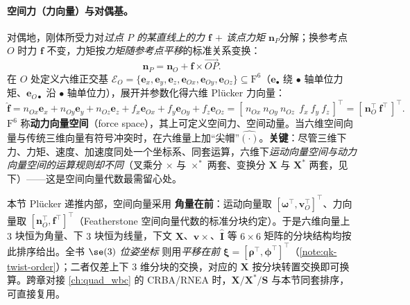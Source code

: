 \paragraph{空间力（力向量）与对偶基。}
对偶地，刚体所受力对\emph{过点 $P$ 的某直线上的力 $\boldsymbol{f}$ $+$ 该点力矩 $\boldsymbol{n}_P$}分解；换参考点 $O$ 时力 $\boldsymbol{f}$ 不变，力矩按\emph{力矩随参考点平移}的标准关系变换\cite{yu2021quadruped}：
\begin{equation}
  \boldsymbol{n}_P=\boldsymbol{n}_O+\boldsymbol{f}\times\overrightarrow{OP}.
  \label{eq:qk-wrench-shift}
\end{equation}
在 $O$ 处定义六维正交基 $\mathcal{E}_O=\{\boldsymbol{e}_x,\boldsymbol{e}_y,\boldsymbol{e}_z,\boldsymbol{e}_{Ox},\boldsymbol{e}_{Oy},\boldsymbol{e}_{Oz}\}\subseteq\mathrm{F}^6$（$\boldsymbol{e}_\bullet$ 绕 $\bullet$ 轴单位力矩、$\boldsymbol{e}_{O\bullet}$ 沿 $\bullet$ 轴单位力），展开并参数化得六维 Plücker 力向量\cite{yu2021quadruped}：
\begin{equation}
  \hat{\boldsymbol{f}}=n_{Ox}\boldsymbol{e}_x+n_{Oy}\boldsymbol{e}_y+n_{Oz}\boldsymbol{e}_z+f_x\boldsymbol{e}_{Ox}+f_y\boldsymbol{e}_{Oy}+f_z\boldsymbol{e}_{Oz}
  =[\,n_{Ox}\ n_{Oy}\ n_{Oz}\ \ f_x\ f_y\ f_z\,]^\top=[\,\boldsymbol{n}_O^\top\ \boldsymbol{f}^\top\,]^\top.
  \label{eq:qk-spatial-force}
\end{equation}
$\mathrm{F}^6$ 称\textbf{动力向量空间}（force space），其上可定义空间力、空间动量。当六维空间向量与传统三维向量有符号冲突时，在六维量上加“尖帽”$\hat{(\cdot)}$。\textbf{关键}：尽管三维下力、力矩、速度、加速度同处一个坐标系、同套运算，六维下\emph{运动向量空间与动力向量空间的运算规则却不同}（叉乘分 $\times$ 与 $\times^{*}$ 两套、变换分 $\mathbf{X}$ 与 $\mathbf{X}^{*}$ 两套，见下）——这是空间向量代数最需留心处。

\begin{note}\label{note:qk-plucker-order}
本节 Plücker 递推内部，空间向量采用 \textbf{角量在前}：运动向量取 $[\boldsymbol{\omega}^\top,\boldsymbol{v}_O^\top]^\top$、力向量取 $[\boldsymbol{n}_O^\top,\boldsymbol{f}^\top]^\top$（Featherstone 空间向量代数的标准分块约定）。于是六维向量上 $3$ 块恒为角量、下 $3$ 块恒为线量，下文 $\mathbf{X}$、$\boldsymbol{v}\times$、$\hat{\mathbf{I}}$ 等 $6\times6$ 矩阵的分块结构均按此排序给出。全书 $\se(3)$ \emph{位姿坐标} 则用\emph{平移在前} $\boldsymbol{\xi}=[\boldsymbol{\rho}^\top,\boldsymbol{\phi}^\top]^\top$（\cref{note:qk-twist-order}）；二者仅差上下 $3$ 维分块的交换，对应的 $\mathbf{X}$ 按分块转置交换即可换算。跨章对接 \cref{ch:quad_wbc} 的 CRBA/RNEA 时，$\mathbf{X}/\mathbf{X}^{*}/\mathbf{S}$ 与本节同套排序，可直接复用。
\end{note}

